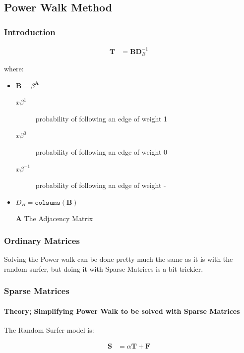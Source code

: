 \documentclass[11pt]{article}
\begin{document}
\subsection{Power Walk Method}
\label{sec:org6f7c322}
\subsubsection{Introduction}
\label{sec:org0e61de2}

\begin{align}
\mathbf{T} &= \mathbf{B} \mathbf{D}^{-1}_{B} \label{eq:pwalk-def}
\end{align}



where:

\begin{itemize}
\item \(\mathbf{B}= \beta^{\mathbf{A}}\)
\begin{description}
\item[{\(x\beta^{1}\) }] probability of following an edge of weight 1
\item[{\(x\beta^{0}\) }] probability of following an edge of weight 0
\item[{\(x\beta^{-1}\)}] probability of following an edge of weight -
\end{description}
\item \(D_{B} = \mathtt{colsums}(\mathbf{B})\)
\item[{\(\mathbf{A}\)}] The Adjacency Matrix
\end{itemize}

\subsubsection{Ordinary Matrices}
\label{sec:orgb7eb39f}
Solving the Power walk can be done pretty much the same as it is with the random surfer, but doing it with Sparse Matrices is a bit trickier.
\subsubsection{Sparse Matrices}
\label{sec:orgef01898}
\paragraph{Theory; Simplifying Power Walk to be solved with Sparse Matrices}
\label{sec:orgd628789}
The Random Surfer model is:

$$\begin{aligned}
    \mathbf{S} &= \alpha \mathbf{T} +  \mathbf{F}  \label{eq:sparse-RS}\end{aligned}$$
\end{document}
